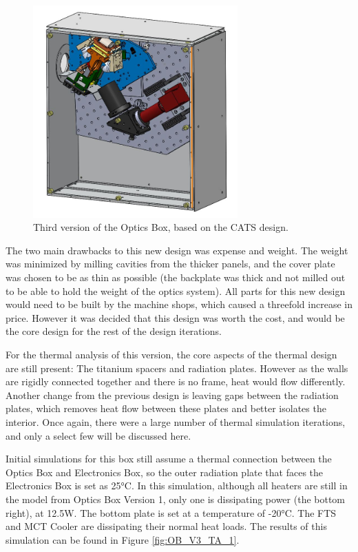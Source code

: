 \begin{figure}
    \centering
    \includegraphics[width=0.7\textwidth]{chap3_images/LIFE_V3_images/Optics_Box_V2.JPG}
    \caption{Third version of the Optics Box, based on the CATS design.}
    \label{fig:OB_V3}
\end{figure}

The two main drawbacks to this new design was expense and weight. The weight was minimized by milling cavities from the thicker panels, and the cover plate was chosen to be as thin as possible (the backplate was thick and not milled out to be able to hold the weight of the optics system). All parts for this new design would need to be built by the machine shops, which caused a threefold increase in price. However it was decided that this design was worth the cost, and would be the core design for the rest of the design iterations.

For the thermal analysis of this version, the core aspects of the thermal design are still present: The titanium spacers and radiation plates. However as the walls are rigidly connected together and there is no frame, heat would flow differently. Another change from the previous design is leaving gaps between the radiation plates, which removes heat flow between these plates and  better isolates the interior. Once again, there were a large number of thermal simulation iterations, and only a select few will be discussed here.

Initial simulations for this box still assume a thermal connection between the Optics Box and Electronics Box, so the outer radiation plate that faces the Electronics Box is set as 25°C. In this simulation, although all heaters are still in the model from Optics Box Version 1, only one is dissipating power (the bottom right), at 12.5W. The bottom plate is set at a temperature of -20°C. The FTS and MCT Cooler are dissipating their normal heat loads. The results of this simulation can be found in Figure \ref{fig:OB_V3_TA_1}.

